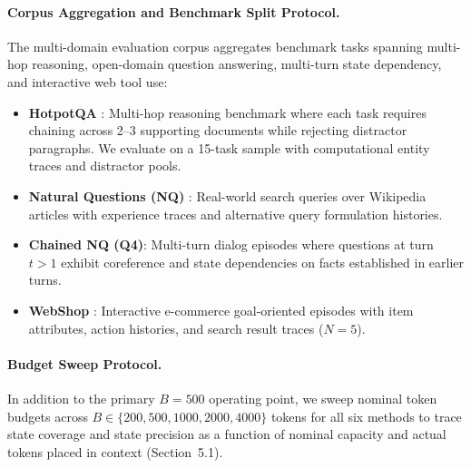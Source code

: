 \documentclass{article}
\begin{document}
\paragraph{Corpus Aggregation and Benchmark Split Protocol.} The multi-domain evaluation corpus aggregates benchmark tasks spanning multi-hop reasoning, open-domain question answering, multi-turn state dependency, and interactive web tool use:
\begin{itemize}
\item \textbf{HotpotQA} \citep{yang2018hotpotqa}: Multi-hop reasoning benchmark where each task requires chaining across 2--3 supporting documents while rejecting distractor paragraphs. We evaluate on a 15-task sample with computational entity traces and distractor pools.
\item \textbf{Natural Questions (NQ)} \citep{kwiatkowski2019naturalquestions}: Real-world search queries over Wikipedia articles with experience traces and alternative query formulation histories.
\item \textbf{Chained NQ (Q4)}: Multi-turn dialog episodes where questions at turn $t > 1$ exhibit coreference and state dependencies on facts established in earlier turns.
\item \textbf{WebShop} \citep{yao2022webshop}: Interactive e-commerce goal-oriented episodes with item attributes, action histories, and search result traces ($N=5$).
\end{itemize}

\paragraph{Budget Sweep Protocol.} In addition to the primary $B=500$ operating point, we sweep nominal token budgets across $B \in \{200, 500, 1000, 2000, 4000\}$ tokens for all six methods to trace state coverage and state precision as a function of nominal capacity and actual tokens placed in context (Section~5.1).
\end{document}
